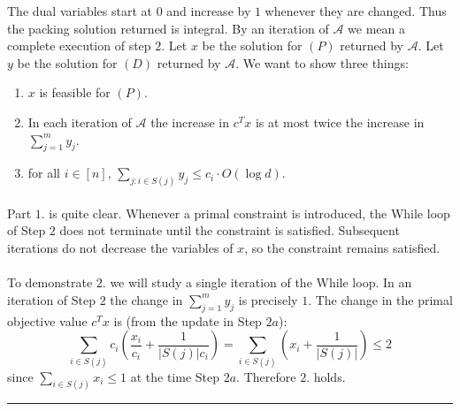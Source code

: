 \documentclass[letterpaper,12pt,oneside,onecolumn]{article}
\newcommand{\cA}{\mathcal{A}} \newcommand{\cB}{\mathcal{B}}
\newenvironment{proof}{{\bf Proof:  }}{\hfill\rule{2mm}{2mm}}
\begin{document}
\begin{proof}
The dual variables start at $0$ and increase by $1$ whenever they are changed. Thus the packing solution returned is integral. By an iteration of $\cA$ we mean a complete execution of step $2$. Let $x$ be the solution for $(P)$ returned by $\cA$. Let $y$ be the solution for $(D)$ returned by $\cA$. We want to show three things:
\begin{enumerate}
\item $x$ is feasible for $(P)$.
\item In each iteration of $\cA$ the increase in $c^Tx$ is at most twice the increase in $\sum_{j=1}^m y_j$.
\item for all $i \in [n]$, $\sum_{j : i \in S(j)} y_j \leq c_i \cdot O(\log d)$.
\end{enumerate}
\paragraph{}
Part $1.$ is quite clear. Whenever a primal constraint is introduced, the While loop of Step $2$ does not terminate until the constraint is satisfied. Subsequent iterations do not decrease the variables of $x$, so the constraint remains satisfied.
\paragraph{}
To demonstrate $2.$ we will study a single iteration of the While loop. In an iteration of Step $2$ the change in $\sum_{j=1}^m y_j$ is precisely $1$. The change in the primal objective value $c^Tx$ is (from the update in Step $2a$):
$$\sum_{i \in S(j)} c_i (\frac{x_i}{c_i} + \frac{1}{|S(j)| c_i}) = \sum_{i \in S(j)}(x_i + \frac{1}{|S(j)|}) \leq 2$$
since $\sum_{i \in S(j)} x_i \leq 1$ at the time Step $2a$. Therefore $2.$ holds.

\end{proof}
\end{document}
